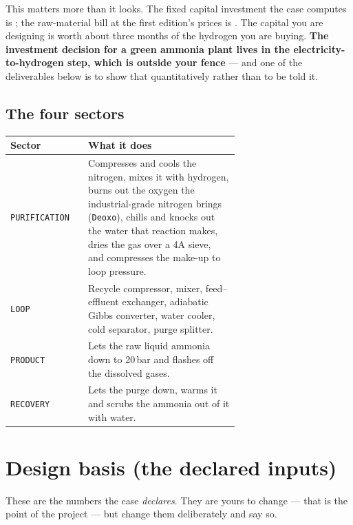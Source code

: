\documentclass[11pt,a4paper]{article}
\begin{document}
This matters more than it looks. The fixed capital investment the case computes
is ; the raw-material bill at the first edition's
prices is . The capital you are designing
is worth about three months of the hydrogen you are buying. \textbf{The
investment decision for a green ammonia plant lives in the electricity-to-hydrogen
step, which is outside your fence} --- and one of the deliverables below is to
show that quantitatively rather than to be told it.

\subsection*{The four sectors}

{\small\begin{longtable}{@{}lL{0.66\linewidth}@{}}
\toprule
\textbf{Sector} & \textbf{What it does} \\
\midrule
\texttt{PURIFICATION} & Compresses and cools the nitrogen, mixes it with
hydrogen, burns out the oxygen the industrial-grade nitrogen brings
(\texttt{Deoxo}), chills and knocks out the water that reaction makes, dries
the gas over a 4A sieve, and compresses the make-up to loop pressure. \\
\texttt{LOOP} & Recycle compressor, mixer, feed--effluent exchanger, adiabatic
Gibbs converter, water cooler, cold separator, purge splitter. \\
\texttt{PRODUCT} & Lets the raw liquid ammonia down to 20\,bar and flashes off
the dissolved gases. \\
\texttt{RECOVERY} & Lets the purge down, warms it and scrubs the ammonia out of
it with water. \\
\bottomrule
\end{longtable}}

\section{Design basis (the declared inputs)}

These are the numbers the case \emph{declares}. They are yours to change ---
that is the point of the project --- but change them deliberately and say so.
\end{document}
